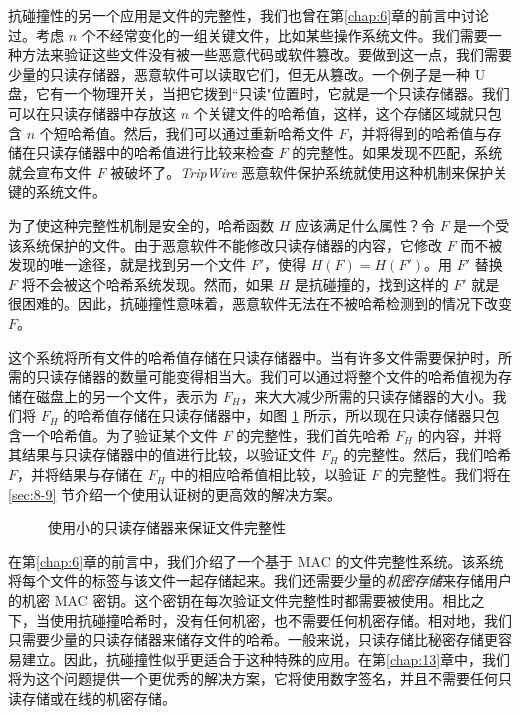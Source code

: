 \begin{snote}[文件完整性。]
抗碰撞性的另一个应用是文件的完整性，我们也曾在第\ref{chap:6}章的前言中讨论过。考虑 $n$ 个不经常变化的一组关键文件，比如某些操作系统文件。我们需要一种方法来验证这些文件没有被一些恶意代码或软件篡改。要做到这一点，我们需要少量的只读存储器，恶意软件可以读取它们，但无从篡改。一个例子是一种 U 盘，它有一个物理开关，当把它拨到``只读"位置时，它就是一个只读存储器。我们可以在只读存储器中存放这 $n$ 个关键文件的哈希值，这样，这个存储区域就只包含 $n$ 个短哈希值。然后，我们可以通过重新哈希文件 $F$，并将得到的哈希值与存储在只读存储器中的哈希值进行比较来检查 $F$ 的完整性。如果发现不匹配，系统就会宣布文件 $F$ 被破坏了。\emph{TripWire} 恶意软件保护系统就使用这种机制来保护关键的系统文件。

为了使这种完整性机制是安全的，哈希函数 $H$ 应该满足什么属性？令 $F$ 是一个受该系统保护的文件。由于恶意软件不能修改只读存储器的内容，它修改 $F$ 而不被发现的唯一途径，就是找到另一个文件 $F'$，使得 $H(F)=H(F')$。用 $F'$ 替换 $F$ 将不会被这个哈希系统发现。然而，如果 $H$ 是抗碰撞的，找到这样的 $F'$ 就是很困难的。因此，抗碰撞性意味着，恶意软件无法在不被哈希检测到的情况下改变 $F$。

这个系统将所有文件的哈希值存储在只读存储器中。当有许多文件需要保护时，所需的只读存储器的数量可能变得相当大。我们可以通过将整个文件的哈希值视为存储在磁盘上的另一个文件，表示为 $F_H$，来大大减少所需的只读存储器的大小。我们将 $F_H$ 的哈希值存储在只读存储器中，如图 \ref{fig:8-2} 所示，所以现在只读存储器只包含一个哈希值。为了验证某个文件 $F$ 的完整性，我们首先哈希 $F_H$ 的内容，并将其结果与只读存储器中的值进行比较，以验证文件 $F_H$ 的完整性。然后，我们哈希 $F$，并将结果与存储在 $F_H$ 中的相应哈希值相比较，以验证 $F$ 的完整性。我们将在 \ref{sec:8-9} 节介绍一个使用认证树的更高效的解决方案。

\begin{figure}
	\centering
	
	\caption{使用小的只读存储器来保证文件完整性}
	\label{fig:8-2}
\end{figure}

在第\ref{chap:6}章的前言中，我们介绍了一个基于 MAC 的文件完整性系统。该系统将每个文件的标签与该文件一起存储起来。我们还需要少量的\emph{机密存储}来存储用户的机密 MAC 密钥。这个密钥在每次验证文件完整性时都需要被使用。相比之下，当使用抗碰撞哈希时，没有任何机密，也不需要任何机密存储。相对地，我们只需要少量的只读存储器来储存文件的哈希。一般来说，只读存储比秘密存储更容易建立。因此，抗碰撞性似乎更适合于这种特殊的应用。在第\ref{chap:13}章中，我们将为这个问题提供一个更优秀的解决方案，它将使用数字签名，并且不需要任何只读存储或在线的机密存储。
\end{snote}

